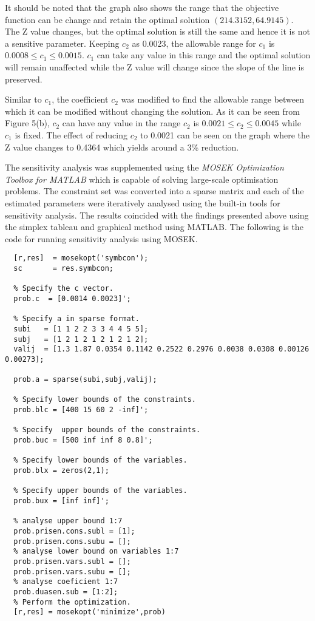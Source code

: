 \documentclass[
]{article}
\begin{document}
\begin{enumerate}
	      It should be noted that the graph also shows the range that the objective function
	      can be change and retain the optimal solution $\left(214.3152, 64.9145\right)$. The Z value changes, but the optimal solution is still the same and hence it is not a sensitive parameter.
	      Keeping $c_2$ as 0.0023, the allowable range for $c_1$ is \(0.0008 \le c_1 \le 0.0015\). $c_1$ can take any value in this range and the optimal solution will remain unaffected while the Z value will change since the slope of the line is preserved.
	      	        
	      Similar to $c_1$, the coefficient $c_2$ was modified to find the allowable range between which it can be modified without changing the solution.
	      As it can be seen from Figure 5(b), $c_2$ can have any value in the range $c_2$ is \(0.0021 \le c_2 \le 0.0045\) while $c_1$ is fixed.
	      The effect of reducing $c_2$ to 0.0021 can be seen on the graph where the Z value changes to 0.4364 which yields around a 3\% reduction.
\end{enumerate}


The sensitivity analysis was supplemented using the \textit{MOSEK Optimization Toolbox for MATLAB} which is capable of solving large-scale optimisation problems.
The constraint set was converted into a sparse matrix and each of the estimated parameters were iteratively analysed using the built-in tools for sensitivity analysis.
The results coincided with the findings presented above using the simplex tableau and graphical method using MATLAB. The following is the code for running sensitivity analysis using MOSEK.

\begin{lstlisting}
  [r,res]  = mosekopt('symbcon');
  sc       = res.symbcon;

  % Specify the c vector.
  prob.c  = [0.0014 0.0023]';

  % Specify a in sparse format.
  subi   = [1 1 2 2 3 3 4 4 5 5];
  subj   = [1 2 1 2 1 2 1 2 1 2];
  valij  = [1.3 1.87 0.0354 0.1142 0.2522 0.2976 0.0038 0.0308 0.00126 0.00273];

  prob.a = sparse(subi,subj,valij);

  % Specify lower bounds of the constraints.
  prob.blc = [400 15 60 2 -inf]';

  % Specify  upper bounds of the constraints.
  prob.buc = [500 inf inf 8 0.8]';

  % Specify lower bounds of the variables.
  prob.blx = zeros(2,1);

  % Specify upper bounds of the variables.
  prob.bux = [inf inf]';

  % analyse upper bound 1:7
  prob.prisen.cons.subl = [1];
  prob.prisen.cons.subu = [];
  % analyse lower bound on variables 1:7
  prob.prisen.vars.subl = [];
  prob.prisen.vars.subu = [];
  % analyse coeficient 1:7
  prob.duasen.sub = [1:2];
  % Perform the optimization.
  [r,res] = mosekopt('minimize',prob) 
\end{lstlisting}
 
\end{document}
